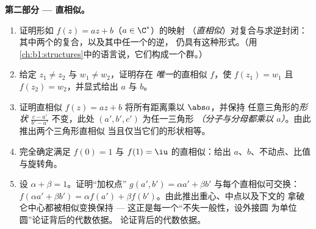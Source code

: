 \begin{problem}
\medskip
\noindent\textbf{第二部分 --- 直相似。}
\begin{enumerate}[resume]
  \item 证明形如 $f(z) = az + b$（$a \in \C^*$）的映射
        （\emph{直相似}）对复合与求逆封闭：
        其中两个的复合，以及其中任一个的逆，
        仍具有这种形式。（用
        \cref{ch:b1:structures}中的语言说，它们构成一个群。）
  \item 给定 $z_1 \neq z_2$ 与 $w_1 \neq w_2$，证明存在
        \emph{唯一}的直相似 $f$，使 $f(z_1) = w_1$ 且
        $f(z_2) = w_2$，并显式给出 $a$ 与 $b$。
  \item 证明直相似 $f(z) = az + b$ 将所有距离乘以 $\abs a$，并保持
        任意三角形的\emph{形状}
        $\frac{c - a'}{b' - a'}$ 不变，此处 $(a', b', c')$ 为任一三角形
        \emph{（分子与分母都乘以
        $a$）}。由此推出两个三角形直相似
        当且仅当它们的形状相等。
  \item 完全确定满足 $f(0) = 1$
        与 $f(1) = \iu$ 的直相似：给出 $a$、$b$、不动点、比值
        与旋转角。
  \item 设 $\alpha + \beta = 1$。证明“加权点”
        $g(a', b') = \alpha a' + \beta b'$ 与每个直相似可交换：
        $f(\alpha a' + \beta b') = \alpha f(a')
        + \beta f(b')$。由此推出重心、中点以及下文的
        拿破仑中心都被相似变换保持
        --- 这正是每一个“不失一般性，设外接圆
        为单位圆”论证背后的代数依据。
        论证背后的代数依据。
\end{enumerate}


\end{problem}
